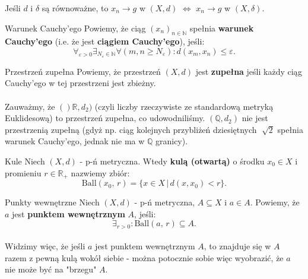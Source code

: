 \documentclass{article}
\numberwithin{defi}{section}
\numberwithin{defi}{section}
\newcommand{\R}{\mathbb{R}}
\newcommand{\N}{\mathbb{N}}
\newcommand{\Q}{\mathbb{Q}}
\providecommand{\eps}{\varepsilon}
\newcommand{\ciag}[1]{(#1_{n})_{n \in \N}}
\newcommand{\ball}[2]{\text{Ball}(#1, \, #2)}
\begin{document}
\begin{obs}{}
    Jeśli $d$ i $\delta$ są równoważne, to $x_n \to g$ w $(X, d)$ $\iff$ $x_n \to g$ w $(X, \delta)$.
\end{obs}

\begin{defr}{Warunek Cauchy'ego}
    Powiemy, że ciąg $\ciag{x}$ spełnia \textbf{warunek Cauchy'ego} (i.e. że jest \textbf{ciągiem Cauchy'ego}), jeśli:
    \begin{equation}
        \forall_{\eps > 0} \exists_{N_\eps \in \N} \forall (m,n \geqslant N_\eps): d(x_m, x_n) \leqslant \eps.
    \end{equation}
\end{defr}

\begin{defr}{Przestrzeń zupełna}
    Powiemy, że przestrzeń $(X,d)$ jest \textbf{zupełna} jeśli każdy ciąg Cauchy'ego w tej przestrzeni jest zbieżny.
\end{defr}

\paragraph{} Zauważmy, że $()\R, d_2)$ (czyli liczby rzeczywiste ze standardową metryką Euklidesową) to przestrzeń zupełna, co udowodniliśmy. $(\Q, d_2)$ nie jest przestrzenią zupełną (gdyż np. ciąg kolejnych przybliżeń dziesiętnych $\sqrt[]{2}$ spełnia warunek Cauchy'ego, jednak nie ma w $\Q$ granicy).\

\begin{defr}{Kule}
    Niech $(X, d)$ - p-ń metryczna. Wtedy \textbf{kulą (otwartą)} o środku $x_0 \in X$ i promieniu $r \in \R_+$ nazwiemy zbiór:
    \begin{equation}
        \ball{x_0}{r} = \{ x\in X \, | \, d(x, x_0) < r\}.
    \end{equation}
\end{defr}

\begin{defr}{Punkty wewnętrzne}
    Niech $(X, d)$ - p-ń metryczna, $A \subseteq X$ i $a \in A$. Powiemy, że $a$ jest \textbf{punktem wewnętrznym} $A$, jeśli:
    \begin{equation}
        \exists_{r>0}: \ball{a}{r} \subseteq A.
    \end{equation}
\end{defr}

\paragraph{} Widzimy więc, że jeśli $a$ jest punktem wewnętrznym $A$, to znajduje się w $A$ razem z pewną kulą wokół siebie - można potocznie sobie więc wyobrazić, że $a$ nie może być na "brzegu" $A$.
\end{document}
